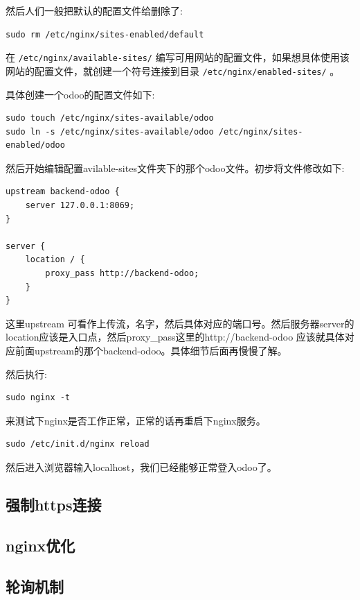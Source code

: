 \documentclass[11pt,a4paper]{sphinxmanual}
\begin{document}
然后人们一般把默认的配置文件给删除了:
\begin{Verbatim}
sudo rm /etc/nginx/sites-enabled/default
\end{Verbatim}

在 \verb~/etc/nginx/available-sites/~ 编写可用网站的配置文件，如果想具体使用该网站的配置文件，就创建一个符号连接到目录 \verb~/etc/nginx/enabled-sites/~ 。

具体创建一个odoo的配置文件如下:
\begin{Verbatim}
sudo touch /etc/nginx/sites-available/odoo
sudo ln -s /etc/nginx/sites-available/odoo /etc/nginx/sites-enabled/odoo
\end{Verbatim}

然后开始编辑配置avilable-sites文件夹下的那个odoo文件。初步将文件修改如下:

\begin{Verbatim}
upstream backend-odoo {
    server 127.0.0.1:8069;
}

server {
    location / {
        proxy_pass http://backend-odoo;
    }
}
\end{Verbatim}

这里upstream 可看作上传流，名字，然后具体对应的端口号。然后服务器server的location应该是入口点，然后proxy\_pass这里的http://backend-odoo 应该就具体对应前面upstream的那个backend-odoo。具体细节后面再慢慢了解。

然后执行:
\begin{Verbatim}
sudo nginx -t
\end{Verbatim}

来测试下nginx是否工作正常，正常的话再重启下nginx服务。

\begin{Verbatim}
sudo /etc/init.d/nginx reload
\end{Verbatim}

然后进入浏览器输入localhost，我们已经能够正常登入odoo了。

\subsection{强制https连接}
\label{sec-13-3-2}


\subsection{nginx优化}
\label{sec-13-3-3}

\subsection{轮询机制}
\label{sec-13-3-4}
\end{document}
